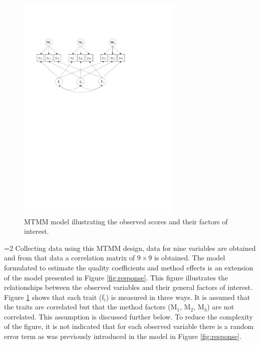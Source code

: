 \documentclass[a4paper,12pt]{article}
\begin{document}
\begin{figure}[htb]\centering
\includegraphics[width=0.7\textwidth]{MTMM}
\caption{\label{fig:mtmm}MTMM model illustrating the observed scores and their factors of interest.}
\end{figure}

=2
Collecting data using this MTMM design, data for nine variables are obtained and from that data a correlation matrix of $9 \times 9$ is obtained. The model formulated to estimate the quality coefficients and method effects is an extension of the model presented in Figure \ref{fig:response}. This figure illustrates the relationships between the observed variables and their general factors of interest. Figure \ref{fig:mtmm} shows that each trait (f$_i$) is measured in three ways. It is assumed that the traits are correlated but that the method factors (M$_1$, M$_2$, M$_3$) are not correlated. This assumption is discussed further below. To reduce the complexity of the figure, it is not indicated that for each observed variable there is a random error term as was previously introduced in the model in Figure \ref{fig:response}. 
\end{document}
